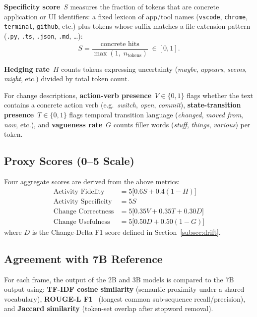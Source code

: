 \documentclass[10pt, twocolumn]{article}
\begin{document}
\textbf{Specificity score}~$S$ measures the fraction of tokens that are concrete
application or UI identifiers: a fixed lexicon of app/tool names
(\texttt{vscode}, \texttt{chrome}, \texttt{terminal}, \texttt{github}, etc.) plus
tokens whose suffix matches a file-extension pattern
(\texttt{.py}, \texttt{.ts}, \texttt{.json}, \texttt{.md}, \ldots):
\[
  S = \frac{\text{concrete hits}}{\max(1,\; n_{\text{tokens}})} \;\in [0,1].
\]

\textbf{Hedging rate}~$H$ counts tokens expressing uncertainty
(\emph{maybe}, \emph{appears}, \emph{seems}, \emph{might}, etc.) divided by total
token count.

For change descriptions, \textbf{action-verb presence}~$V \in \{0,1\}$ flags whether
the text contains a concrete action verb (e.g.\ \emph{switch}, \emph{open},
\emph{commit}), \textbf{state-transition presence}~$T \in \{0,1\}$ flags temporal
transition language (\emph{changed}, \emph{moved from}, \emph{now}, etc.), and
\textbf{vagueness rate}~$G$ counts filler words (\emph{stuff}, \emph{things},
\emph{various}) per token.

\subsection{Proxy Scores (0--5 Scale)}

Four aggregate scores are derived from the above metrics:
\begin{align*}
  \text{Activity Fidelity}      &= 5\bigl[0.6S + 0.4(1-H)\bigr] \\
  \text{Activity Specificity}   &= 5S \\
  \text{Change Correctness}     &= 5\bigl[0.35V + 0.35T + 0.30D\bigr] \\
  \text{Change Usefulness}      &= 5\bigl[0.50D + 0.50(1-G)\bigr]
\end{align*}
where $D$ is the Change-Delta F1 score defined in Section~\ref{subsec:drift}.

\subsection{Agreement with 7B Reference}

For each frame, the output of the 2B and 3B models is compared to the 7B output using:
\textbf{TF-IDF cosine similarity} (semantic proximity under a shared vocabulary),
\textbf{ROUGE-L F1}~\cite{lin2004rouge} (longest common sub-sequence recall/precision),
and \textbf{Jaccard similarity} (token-set overlap after stopword removal).
\end{document}
